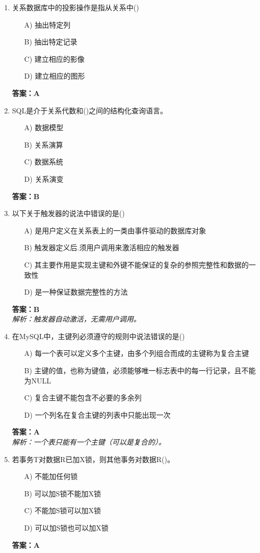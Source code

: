 \documentclass[a4paper,12pt]{article}
\begin{document}
\begin{enumerate}[label=\arabic*.]
\item 关系数据库中的投影操作是指从关系中()
\begin{itemize}
    \item[A)] 抽出特定列
    \item[B)] 抽出特定记录
    \item[C)] 建立相应的影像
    \item[D)] 建立相应的图形
\end{itemize}
\textbf{答案：A}

\item SQL是介于关系代数和()之间的结构化查询语言。
\begin{itemize}
    \item[A)] 数据模型
    \item[B)] 关系演算
    \item[C)] 数据系统
    \item[D)] 关系演变
\end{itemize}
\textbf{答案：B}

\item 以下关于触发器的说法中错误的是()
\begin{itemize}
    \item[A)] 是用户定义在关系表上的一类由事件驱动的数据库对象
    \item[B)] 触发器定义后.须用户调用来激活相应的触发器
    \item[C)] 其主要作用是实现主键和外键不能保证的复杂的参照完整性和数据的一致性
    \item[D)] 是一种保证数据完整性的方法
\end{itemize}
\textbf{答案：B} \\
\textit{解析：触发器自动激活，无需用户调用。}

\item 在MySQL中，主键列必须遵守的规则中说法错误的是()
\begin{itemize}
    \item[A)] 每一个表可以定义多个主键，由多个列组合而成的主键称为复合主键
    \item[B)] 主键的值，也称为键值，必须能够唯一标志表中的每一行记录，且不能为NULL
    \item[C)] 复合主键不能包含不必要的多余列
    \item[D)] 一个列名在复合主键的列表中只能出现一次
\end{itemize}
\textbf{答案：A} \\
\textit{解析：一个表只能有一个主键（可以是复合的）。}

\item 若事务T对数据R已加X锁，则其他事务对数据R()。
\begin{itemize}
    \item[A)] 不能加任何锁
    \item[B)] 可以加S锁不能加X锁
    \item[C)] 不能加S锁可以加X锁
    \item[D)] 可以加S锁也可以加X锁
\end{itemize}
\textbf{答案：A}


\end{enumerate}
\end{document}
